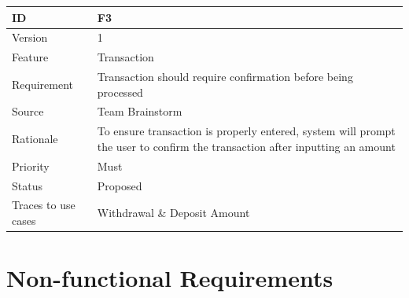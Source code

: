 \documentclass[12pt]{article}
\begin{document}
\begin{table}
  \begin{center}
    \begin{tabular}{|l|p{10cm}|}
      \hline
      \bf ID & \bf {F3}\\
      \hline
      Version & 1\\
      \hline
      Feature & Transaction\\
      \hline
      Requirement & Transaction should require confirmation before being processed\\
      \hline
      Source & Team Brainstorm\\
      \hline
      Rationale & To ensure transaction is properly entered, system will prompt the user to confirm the transaction after inputting an amount\\
      \hline
      Priority & Must\\
      \hline
      Status & Proposed\\
      \hline
      Traces to use cases & Withdrawal \& Deposit Amount\\
      \hline
    \end{tabular}
  \end{center}
\end{table}

\section{Non-functional Requirements}
\end{document}

